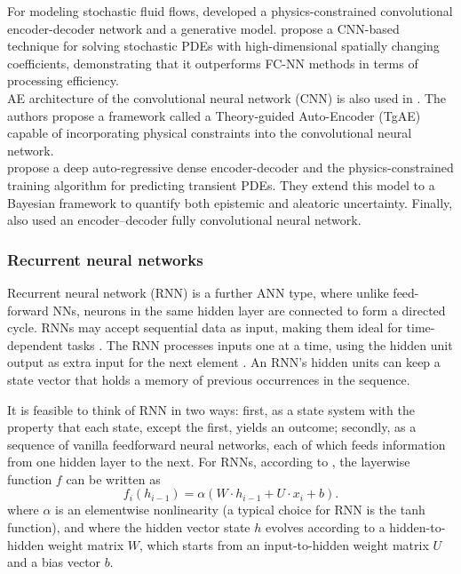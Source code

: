 \documentclass[pdflatex,sn-basic]{sn-jnl}%
\theoremstyle{thmstyleone}%
\theoremstyle{thmstyletwo}%
\theoremstyle{thmstylethree}%
\begin{document}
For modeling stochastic fluid flows, \cite{Zhu2019_PhysicsConstrainedDeep_ZabZZKP}
developed a physics-constrained convolutional encoder-decoder network and a generative model. 
%
\cite{Zhu2019_PhysicsConstrainedDeep_ZabZZKP}  propose a CNN-based technique for solving stochastic PDEs with high-dimensional spatially changing coefficients, demonstrating that it outperforms FC-NN methods in terms of processing efficiency.
\\
\noindent
AE architecture of the convolutional neural network (CNN) is also used in
\cite{Wan2021_TheoryGuidedAuto_ChaWCZ}. %
The authors propose a framework called a Theory-guided Auto-Encoder (TgAE) capable of incorporating physical constraints into the convolutional neural network.
\\
\noindent
\cite{Gen2020_ModelingDynamicsPde_ZabGZ} propose a deep auto-regressive dense encoder-decoder and the physics-constrained training algorithm for predicting transient PDEs. They extend this model to a Bayesian framework to quantify both epistemic and aleatoric uncertainty. %
%
Finally, \cite{Gru2021_DeepNeuralNetwork_HajGHL} also used an encoder–decoder fully convolutional neural network. 



\subsubsection{Recurrent neural networks}
Recurrent neural network (RNN) is a further ANN type, where unlike feed-forward NNs, neurons in the same hidden layer are connected to form a directed cycle. RNNs may accept sequential data as input, making them ideal for time-dependent tasks \citep{Che2018_RiseDeepLearning_EngCEW}.
The RNN processes inputs one at a time, using the hidden unit output as extra input for the next element \citep{Ber2019_SurveyDeepLearning_BucBBCC}.
An RNN's hidden units can keep a state vector that holds a memory of previous occurrences in the sequence.

It is feasible to think of RNN in two ways: first, as a state system with the property that each state, except the first, yields an outcome; secondly, as a sequence of vanilla feedforward neural networks, each of which feeds information from one hidden layer to the next. %
For RNNs, according to \cite{Cat2018_SpecificNetworkDescriptions_ChaCC}, the layerwise function $f$ can be written as
$$
f_i (h_{i-1}) = \alpha (W \cdot h_{i-1} + U \cdot x_i + b).
$$
where $\alpha$ is an elementwise nonlinearity (a typical choice for RNN is the tanh function), 
and where  the hidden vector state $h$  evolves according to
a hidden-to-hidden weight matrix $W$, which starts from an input-to-hidden weight matrix
$U$ and a bias vector $b$.
\end{document}
